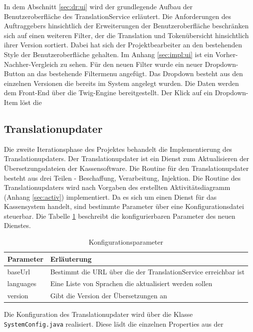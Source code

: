\documentclass[10pt, oneside, ngerman]{article}
\begin{document}
    In dem Abschnitt \ref{sec:dr:ui} wird der grundlegende Aufbau der Benutzeroberfläche des TranslationService erläutert. Die Anforderungen des Auftraggebers hinsichtlich der 
    Erweiterungen der Benutzeroberfläche beschränken sich auf einen weiteren Filter, der die Translation und Tokenübersicht hinsichtlich ihrer Version sortiert.
    Dabei hat sich der Projektbearbeiter an den bestehenden Style der Benutzeroberfläche gehalten. Im Anhang \ref{sec:impl:ui} ist ein Vorher-Nachher-Vergleich zu sehen.
    Für den neuen Filter wurde ein neuer Dropdown-Button an das bestehende Filtermenu angefügt. Das Dropdown besteht aus den einzelnen Versionen die bereits im System angelegt wurden.
    Die Daten werden dem Front-End über die Twig-Engine bereitgestellt. Der Klick auf ein Dropdown-Item löst die %
  \subsection{Translationupdater}
    Die zweite Iterationsphase des Projektes behandelt die Implementierung des Translationupdaters. Der Translationupdater ist ein Dienst zum Aktualisieren der Übersetzungsdateien der Kassensoftware. 
    Die Routine für den Translationupdater besteht aus drei Teilen - Beschaffung, Verarbeitung, Injektion. Die Routine des Translationupdaters wird nach Vorgaben des erstellten Aktivitätsdiagramm (Anhang \ref{sec:activ}) implementiert. 
    Da es sich um einen Dienst für das Kassensystem handelt, sind bestimmte Parameter über eine Konfigurationsdatei steuerbar. Die Tabelle \ref{tab:impl:tu:config} beschreibt die konfigurierbaren Parameter des neuen Dienstes.
    \begin{table}[ht]
      \centering
      \begin{tabular}{l l}
        \hline
        \rowcolor{carolinablue}
        Parameter & Erläuterung \\
        \hline
        baseUrl & Bestimmt die URL über die der TranslationService erreichbar ist\\
        \rowcolor{lightgray}
        languages & Eine Liste von Sprachen die aktualisiert werden sollen\\
        version & Gibt die Version der Übersetzungen an
      \end{tabular}
      \caption{Konfigurationsparameter}
      \label{tab:impl:tu:config}
    \end{table} 
    Die Konfiguration des Translationupdater wird über die Klasse \lstinline{SystemConfig.java} realisiert. Diese lädt die einzelnen Properties aus der 
\end{document}
